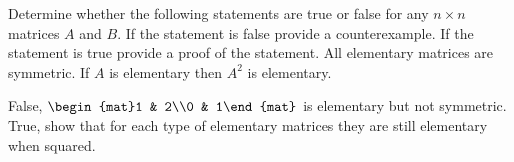 
\begin{Exercise}[
name={},
title={}, 
difficulty=0,
origin={\cite{BS}}]
Determine whether the following statements are true or false for any $n\times n$
matrices $A$ and $B$.  If the statement is false provide a counterexample. If the
statement is true provide a proof of the statement.
\Question All elementary matrices are symmetric.
\Question If $A$ is elementary then $A^2$ is elementary.
\end{Exercise}
\begin{Answer}
\Question False, $\begin{mat}1 & 2\\0 & 1\end{mat}$ is elementary but not symmetric.
\Question True, show that for each type of elementary matrices they are still elementary when squared.
\end{Answer}
